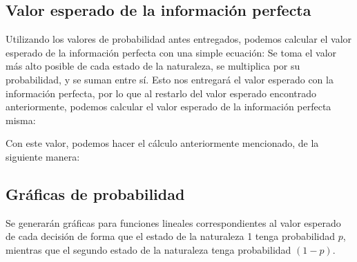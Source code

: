 \subsection{Valor esperado de la información perfecta}
Utilizando los valores de probabilidad antes entregados, podemos calcular el valor esperado de la información perfecta con una simple ecuación: Se toma el valor más alto posible de cada estado de la naturaleza, se multiplica por su probabilidad, y se suman entre sí. Esto nos entregará el valor esperado con la información perfecta, por lo que al restarlo del valor esperado encontrado anteriormente, podemos calcular el valor esperado de la información perfecta misma:


Con este valor, podemos hacer el cálculo anteriormente mencionado, de la siguiente manera:



\subsection{Gráficas de probabilidad}
Se generarán gráficas para funciones lineales correspondientes al valor esperado de cada decisión de forma que el estado de la naturaleza 1 tenga probabilidad $p$, mientras que el segundo estado de la naturaleza tenga probabilidad $(1 - p)$.




